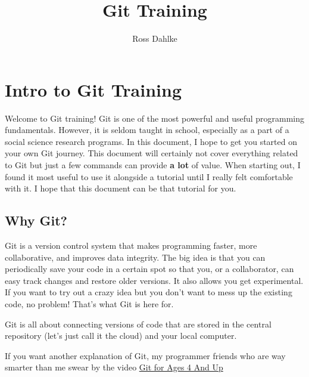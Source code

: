 \documentclass[
  letterpaper,
  DIV=11,
  numbers=noendperiod]{scrartcl}
\title{Git Training}
\author{Ross Dahlke}
\date{}
\renewcommand*\contentsname{Table of contents}
\newcommand\contentsname{Table of contents}
\begin{document}
\maketitle
\ifdefined\Shaded\renewenvironment{Shaded}{\begin{tcolorbox}[frame hidden, interior hidden, boxrule=0pt, enhanced, breakable, sharp corners, borderline west={3pt}{0pt}{shadecolor}]}{\end{tcolorbox}}\fi

\renewcommand*\contentsname{Table of contents}
{
\hypersetup{linkcolor=}
\setcounter{tocdepth}{3}
\tableofcontents
}
\hypertarget{intro-to-git-training}{%
\section{Intro to Git Training}\label{intro-to-git-training}}

Welcome to Git training! Git is one of the most powerful and useful
programming fundamentals. However, it is seldom taught in school,
especially as a part of a social science research programs. In this
document, I hope to get you started on your own Git journey. This
document will certainly not cover everything related to Git but just a
few commands can provide \textbf{a lot} of value. When starting out, I
found it most useful to use it alongside a tutorial until I really felt
comfortable with it. I hope that this document can be that tutorial for
you.

\hypertarget{why-git}{%
\subsection{Why Git?}\label{why-git}}

Git is a version control system that makes programming faster, more
collaborative, and improves data integrity. The big idea is that you can
periodically save your code in a certain spot so that you, or a
collaborator, can easy track changes and restore older versions. It also
allows you get experimental. If you want to try out a crazy idea but you
don't want to mess up the existing code, no problem! That's what Git is
here for.

Git is all about connecting versions of code that are stored in the
central repository (let's just call it the cloud) and your local
computer.

If you want another explanation of Git, my programmer friends who are
way smarter than me swear by the video
\href{https://www.youtube.com/watch?v=1ffBJ4sVUb4\&ab_channel=HackersOnBoard}{Git
for Ages 4 And Up}
\end{document}
